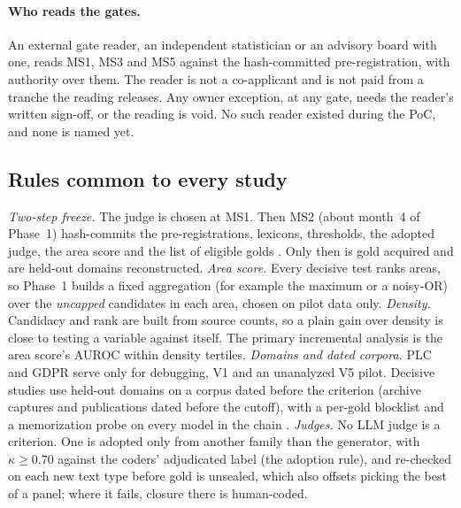 \paragraph{Who reads the gates.} An external gate reader, an independent statistician or an advisory
board with one, reads MS1, MS3 and MS5 against the hash-committed pre-registration, with authority over
them. The reader is not a co-applicant and is not paid from a tranche the reading releases. Any owner
exception, at any gate, needs the reader's written sign-off, or the reading is void. \evobs{} No such
reader existed during the PoC, and none is named yet.

\subsection{Rules common to every study}

\evfut{} \emph{Two-step freeze.} The judge is chosen at MS1. Then MS2 (about month~4 of Phase~1)
hash-commits the pre-registrations, lexicons, thresholds, the adopted judge, the area score and the list
of eligible golds \parencite{nosek2018preregistration}. Only then is gold acquired and are held-out
domains reconstructed. \emph{Area score.} Every decisive test ranks areas, so Phase~1 builds a fixed
aggregation (for example the maximum or a noisy-OR) over the \emph{uncapped} candidates in each area,
chosen on pilot data only. \emph{Density.} Candidacy and rank are built from source counts, so a plain
gain over density is close to testing a variable against itself. The primary incremental analysis is the
area score's AUROC within density tertiles. \emph{Domains and dated corpora.} PLC and GDPR serve only for
debugging, V1 and an unanalyzed V5 pilot. Decisive studies use held-out domains on a corpus dated before
the criterion (archive captures and publications dated before the cutoff), with a per-gold blocklist and
a memorization probe on every model in the chain \parencite{golchin2023time,sainz2023nlp}.
\emph{Judges.} No LLM judge is a criterion. One is adopted only from another family than the generator,
with $\kappa \geq 0.70$ against the coders' adjudicated label (the adoption rule), and re-checked on each
new text type before gold is unsealed, which also offsets picking the best of a panel; where it fails,
closure there is human-coded.

